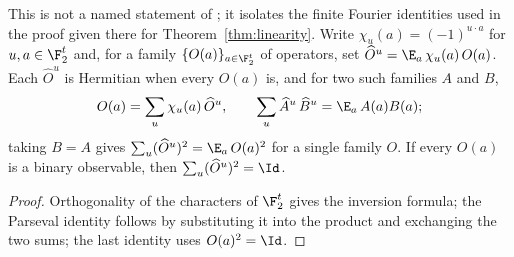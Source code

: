 \begin{lemma}
	\label{lem:boolean-fourier-transform}
	\leanok
	This is not a named statement of \cite{Natarajan2017Linearity}; it isolates
	the finite Fourier identities used in the proof given there for
	Theorem~\ref{thm:linearity}. Write $\chi_u(a) = (-1)^{u \cdot a}$ for
	$u, a \in \F_2^t$ and, for a family $\{O(a)\}_{a \in \F_2^t}$ of operators,
	set $\widehat{O}^u = \E_a \, \chi_u(a) \, O(a)$. Each $\widehat{O}^u$ is
	Hermitian when every $O(a)$ is, and for two such families $A$ and $B$,
	\[
		O(a) = \sum_u \chi_u(a) \, \widehat{O}^u ,
		\qquad
		\sum_u \widehat{A}^u \, \widehat{B}^u = \E_a \, A(a) B(a) ;
	\]
	taking $B = A$ gives $\sum_u (\widehat{O}^u)^2 = \E_a \, O(a)^2$ for a
	single family $O$. If every $O(a)$ is a binary observable, then
	$\sum_u (\widehat{O}^u)^2 = \Id$.
\end{lemma}
\begin{proof}
	\leanok
	Orthogonality of the characters of $\F_2^t$ gives the inversion formula;
	the Parseval identity follows by substituting it into the product and
	exchanging the two sums; the last identity uses $O(a)^2 = \Id$.
\end{proof}

